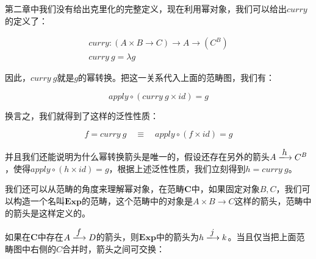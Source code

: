 \documentclass{article}
\begin{document}
第二章中我们没有给出克里化的完整定义，现在利用幂对象，我们可以给出$curry$的定义了：

\[
\begin{array}{l}
curry : (A \times B \to C) \to A \to (C^B) \\
curry\ g = \lambda g
\end{array}
\]

因此，$curry\ g$就是$g$的幂转换。把这一关系代入上面的范畴图，我们有：

\[
  apply \circ (curry\ g \times id) = g
\]

换言之，我们就得到了这样的泛性性质：

\[
  f = curry\ g \quad \equiv \quad apply \circ (f \times id) = g
\]

并且我们还能说明为什么幂转换箭头是唯一的，假设还存在另外的箭头$A \arrowto{h} C^B$，使得$apply \circ (h \times id) = g$，根据上述泛性性质，我们立刻得到$h = curry\ g$。

我们还可以从范畴的角度来理解幂对象，在范畴$\pmb{C}$中，如果固定对象$B, C$，我们可以构造一个名叫$\pmb{Exp}$的范畴，这个范畴中的对象是$A \times B \to C$这样的箭头，范畴中的箭头是这样定义的。

\begin{center}
\end{center}

如果在$\pmb{C}$中存在$A \arrowto{f} D$的箭头，则$\pmb{Exp}$中的箭头为$h \arrowto{j} k$。当且仅当把上面范畴图中右侧的$C$合并时，箭头之间可交换：

\begin{center}
\end{center}
\end{document}

